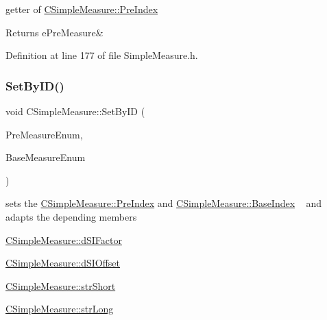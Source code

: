 getter of \hyperlink{classCSimpleMeasure_aa23ed9eec21adb9a97c90a424e7ee18a}{C\+Simple\+Measure\+::\+Pre\+Index} 

\begin{DoxyReturn}{Returns}
e\+Pre\+Measure\& 
\end{DoxyReturn}


Definition at line 177 of file Simple\+Measure.\+h.

\mbox{\label{classCSimpleMeasure_a6945aa333dca5623482d38cd9a7e3225}} 
\subsubsection{\texorpdfstring{Set\+By\+I\+D()}{SetByID()}}
{\footnotesize\ttfamily void C\+Simple\+Measure\+::\+Set\+By\+ID (\begin{DoxyParamCaption}\item[{const \hyperlink{PreMeasure_8h_a6c81167b8d4c2badde42f81cb7214620}{e\+Pre\+Measure}}]{Pre\+Measure\+Enum,  }\item[{const \hyperlink{BaseMeasure_8h_ac90e5164ccf1f0d648fba7e94b229a11}{e\+Base\+Measure}}]{Base\+Measure\+Enum }\end{DoxyParamCaption})}



sets the \hyperlink{classCSimpleMeasure_aa23ed9eec21adb9a97c90a424e7ee18a}{C\+Simple\+Measure\+::\+Pre\+Index} and \hyperlink{classCSimpleMeasure_a191dbfa4cc374946bf8a82111f827d92}{C\+Simple\+Measure\+::\+Base\+Index} ~\newline
 and adapts the depending members 


\begin{DoxyItemize}
\item \hyperlink{classCSimpleMeasure_a08be520f9d3a0e50cc63693f2fc607f2}{C\+Simple\+Measure\+::d\+S\+I\+Factor}
\item \hyperlink{classCSimpleMeasure_a27c1637c744a79856ee81869e2aa8890}{C\+Simple\+Measure\+::d\+S\+I\+Offset}
\item \hyperlink{classCSimpleMeasure_a39260e6516c163955c34dce6795292ad}{C\+Simple\+Measure\+::str\+Short}
\item \hyperlink{classCSimpleMeasure_a5761fb46fb35ce577066ef1e7ec1ab2e}{C\+Simple\+Measure\+::str\+Long}
\end{DoxyItemize}


